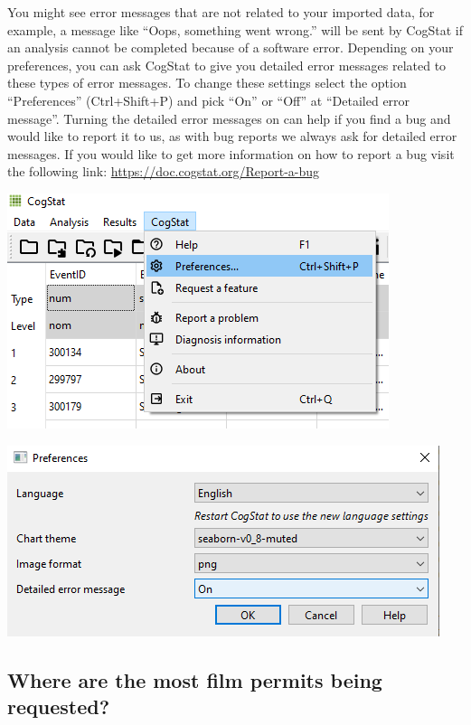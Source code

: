 \documentclass[
]{book}
\begin{document}
You might see error messages that are not related to your imported data, for example, a message like ``Oops, something went wrong.'' will be sent by CogStat if an analysis cannot be completed because of a software error. Depending on your preferences, you can ask CogStat to give you detailed error messages related to these types of error messages. To change these settings select the option ``Preferences'' (Ctrl+Shift+P) and pick ``On'' or ``Off'' at ``Detailed error message''. Turning the detailed error messages on can help if you find a bug and would like to report it to us, as with bug reports we always ask for detailed error messages.
If you would like to get more information on how to report a bug visit the following link: \url{https://doc.cogstat.org/Report-a-bug}

\includegraphics{img/ch1/preferences.png}

\includegraphics{img/ch1/detailederror.png}

\hypertarget{where-are-the-most-film-permits-being-requested-1}{%
\subsection{Where are the most film permits being requested?}\label{where-are-the-most-film-permits-being-requested-1}}
\end{document}
